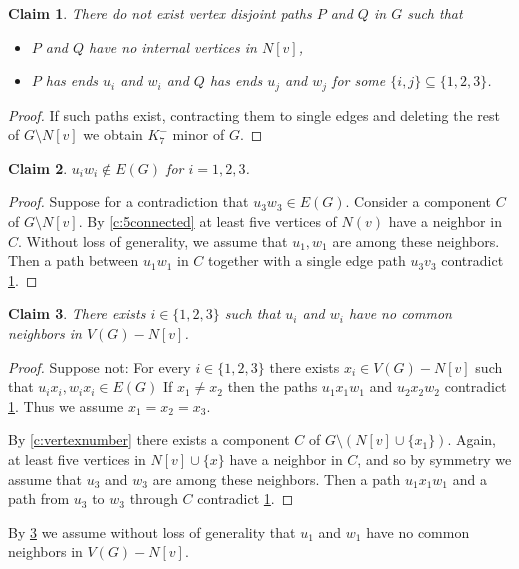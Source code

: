 \documentclass[reqno,final,12pt]{amsart}
\newtheorem{claim}{Claim}[section]
\begin{document}
{ \begin{claim}\label{c:nopaths} There do not exist vertex disjoint paths $P$ and $Q$ in $G$ such that  \begin{itemize}
 		\item $P$ and $Q$ have no internal vertices in $N[v]$,
 		\item $P$ has ends $u_i$ and $w_i$ and $Q$ has ends $u_j$ and $w_j$ for some $\{i,j\} \subseteq \{1,2,3\}$.
 \end{itemize}  
 \end{claim}	
 \begin{proof}	
 	If such paths exist, contracting them to single edges and deleting the rest of $G \setminus N[v]$ we obtain $K^-_7$ minor of $G$.
\end{proof}	
	
 \begin{claim}\label{c:nonedges} $u_iw_i \not \in E(G)$ for $i=1,2,3$. 
\end{claim}	
\begin{proof}	
Suppose for a contradiction that $u_3w_3 \in E(G)$.  Consider a component $C$ of  $G \setminus N[v]$. By \cref{c:5connected} at least five vertices of $N(v)$ have a neighbor in $C$. Without loss of generality, we assume that $u_1,w_1$ are among these neighbors. Then a path between $u_1w_1$ in $C$ together with a single edge path $u_3v_3$ contradict \cref{c:nopaths}.
\end{proof}


\begin{claim}\label{c:nocommonnbrs} There exists $i \in \{1,2,3\}$ such that $u_i$ and $w_i$ have no common neighbors in $V(G)-N[v]$. 
\end{claim}	
\begin{proof}	
Suppose not:  For every $i \in \{1,2,3\}$ there exists $x_i \in V(G) - N[v]$ such that $u_ix_i,w_ix_i \in E(G)$ 	
If $x_1 \neq x_2$ then the paths $u_1x_1w_1$ and $u_2x_2w_2$ contradict \cref{c:nopaths}. Thus we assume $x_1=x_2=x_3$.
 

By \cref{c:vertexnumber} there exists a component $C$ of $G \setminus (N[v] \cup \{x_1\})$. Again, at least five vertices in $N[v] \cup \{x\}$ have a neighbor in $C$, and so by symmetry we assume that $u_3$ and $w_3$ are among these neighbors. Then a path $u_1x_1w_1$ and a path from
$u_3$ to $w_3$ through $C$ contradict \cref{c:nopaths}. 
\end{proof}

By \cref{c:nocommonnbrs} we assume without loss of generality that $u_1$ and $w_1$ have no common neighbors in $V(G)-N[v]$.

}
\end{document}
